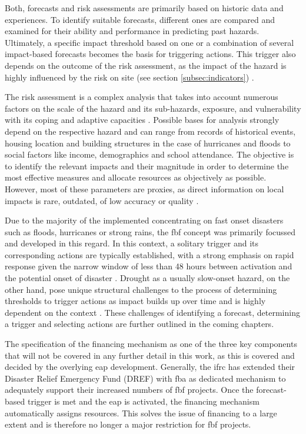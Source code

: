Both, forecasts and risk assessments are primarily based on historic data and experiences. To identify suitable forecasts, different ones are compared and examined for their ability and performance in predicting past hazards. Ultimately, a specific impact threshold based on one or a combination of several impact-based forecasts becomes the basis for triggering actions. This trigger also depends on the outcome of the risk assessment, as the impact of the hazard is highly influenced by the risk on site (see section \ref{subsec:indicators}) \autocite{ifrcFbFPractitionersManual2023,ifrcForecastbasedFinancingNew2019}.

The risk assessment is a complex analysis that takes into account numerous factors on the scale of the hazard and its sub-hazards, exposure, and vulnerability with its coping and adaptive capacities \autocite{ifrcFbFPractitionersManual2023}. Possible bases for analysis strongly depend on the respective hazard and can range from records of historical events, housing location and building structures in the case of hurricanes and floods to social factors like income, demographics and school attendance. The objective is to identify the relevant impacts and their magnitude in order to determine the most effective measures and allocate resources as objectively as possible. However, most of these parameters are proxies, as direct information on local impacts is rare, outdated, of low accuracy or quality \autocite{ifrcFbFPractitionersManual2023}.

Due to the majority of the implemented  concentrating on fast onset disasters such as floods, hurricanes or strong rains, the \acrlong{fbf} concept was primarily focussed and developed in this regard. In this context, a solitary trigger and its corresponding actions are typically established, with a strong emphasis on rapid response given the narrow window of less than 48 hours between activation and the potential onset of disaster \autocite{rcrcFORECASTBASEDFINANCINGEARLY2020}. Drought as a usually slow-onset hazard, on the other hand, pose unique structural challenges to the process of determining thresholds to trigger actions as impact builds up over time and is highly dependent on the context \autocite{boultDroughtImpactbasedForecasting2022}. These challenges of identifying a forecast, determining a trigger and selecting actions are further outlined in the coming chapters.

The specification of the financing mechanism as one of the three key components that will not be covered in any further detail in this work, as this is covered and decided by the overlying \acrshort{eap} development. Generally, the \acrshort{ifrc} has extended their Disaster Relief Emergency Fund (DREF) with \acrfull{fba} as dedicated mechanism to adequately support their increased numbers of \acrshort{fbf} projects. Once the forecast-based trigger is met and the \acrshort{eap} is activated, the financing mechanism automatically assigns resources. This solves the issue of financing to a large extent and is therefore no longer a major restriction for \acrshort{fbf} projects.

